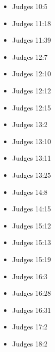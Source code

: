 \documentclass[14pt]{book}
\begin{document}
\begin{multicols}{2}
\begin{itemize}
			\item Judges 10:5
			
			\item Judges 11:18
			
			\item Judges 11:39
			
			\item Judges 12:7
			
			\item Judges 12:10
			
			\item Judges 12:12
			
			\item Judges 12:15
			
			\item Judges 13:2
			
			\item Judges 13:10
			
			\item Judges 13:11
			
			\item Judges 13:25
			
			\item Judges 14:8
			
			\item Judges 14:15
			
			\item Judges 15:12
			
			\item Judges 15:13
			
			\item Judges 15:19
			
			\item Judges 16:3
			
			\item Judges 16:28
			
			\item Judges 16:31
			
			\item Judges 17:2
			
			\item Judges 18:2
			

\end{itemize}
\end{multicols}
\end{document}
